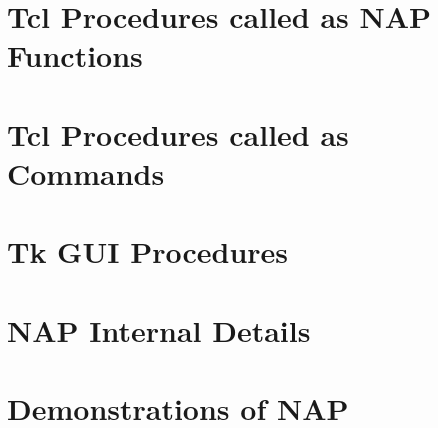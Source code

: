 \documentclass[a4paper]{book}
\begin{document}
\chapter{Tcl Procedures called as NAP Functions}
    
    
    
    
\chapter{Tcl Procedures called as Commands}
    
    
    
    
\chapter{Tk GUI Procedures}
    
    
    
    
\chapter{NAP Internal Details}
    
    
\chapter{Demonstrations of NAP}
    
    
    
    
    
    
    
    
    
    
    
    
\end{document}
